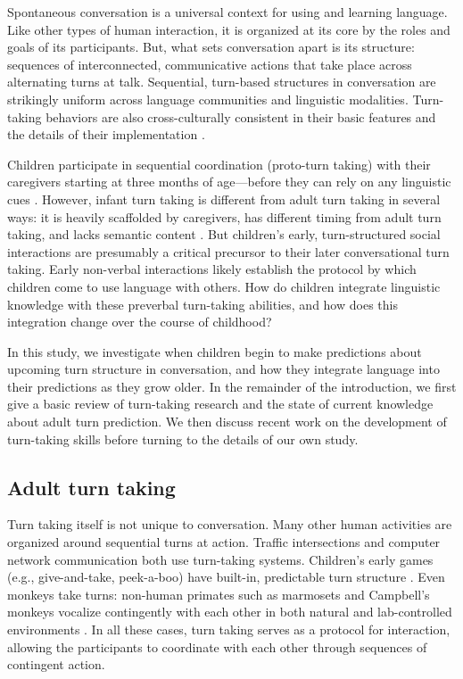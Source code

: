 \documentclass[authoryear, 12pt]{elsarticle}
\begin{document}
Spontaneous conversation is a universal context for using and learning language. Like other types of human interaction, it is organized at its core by the roles and goals of its participants. But, what sets conversation apart is its structure: sequences of interconnected, communicative actions that take place across alternating turns at talk. Sequential, turn-based structures in conversation are strikingly uniform across language communities and linguistic modalities. Turn-taking behaviors are also cross-culturally consistent in their basic features and the details of their implementation \citep{de-vos2015, dingemanse2013, stivers2009}. 

Children participate in sequential coordination (proto-turn taking) with their caregivers starting at three months of age---before they can rely on any linguistic cues \citep[see, among others, ][]{bateson1975, hilbrink2015, jaffe2001, snow1977}. However, infant turn taking is different from adult turn taking in several ways: it is heavily scaffolded by caregivers, has different timing from adult turn taking, and lacks semantic content \citep{hilbrink2015, jaffe2001}. But children's early, turn-structured social interactions are presumably a critical precursor to their later conversational turn taking. Early non-verbal interactions likely establish the protocol by which children come to use language with others. How do children integrate linguistic knowledge with these preverbal turn-taking abilities, and how does this integration change over the course of childhood? 

In this study, we investigate when children begin to make predictions about upcoming turn structure in conversation, and how they integrate language into their predictions as they grow older. In the remainder of the introduction, we first give a basic review of turn-taking research and the state of current knowledge about adult turn prediction. We then discuss recent work on the development of turn-taking skills before turning to the details of our own study.

\subsection{Adult turn taking}

Turn taking itself is not unique to conversation. Many other human activities are organized around sequential turns at action. Traffic intersections and computer network communication both use turn-taking systems. Children's early games (e.g., give-and-take, peek-a-boo) have built-in, predictable turn structure \citep{ratner1978, ross1987}. Even monkeys take turns: non-human primates such as marmosets and Campbell's monkeys vocalize contingently with each other in both natural and lab-controlled environments \citep{lemasson2011, takahashi2013}. In all these cases, turn taking serves as a protocol for interaction, allowing the participants to coordinate with each other through sequences of contingent action. 
\end{document}
